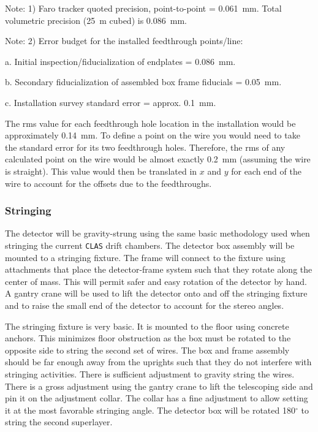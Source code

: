 \noindent
Note: 1) Faro tracker quoted precision, point-to-point = 0.061~mm.  Total 
volumetric precision (25~m cubed) is 0.086~mm.

\vskip 0.1cm

\noindent
Note: 2) Error budget for the installed feedthrough points/line:

\vskip 0.2cm

a. Initial inspection/fiducialization of endplates = 0.086~mm.

b. Secondary fiducialization of assembled box frame fiducials = 0.05~mm.

c. Installation survey standard error = approx. 0.1~mm.

\vskip 0.2cm

The rms value for each feedthrough hole location in the installation would 
be approximately 0.14~mm.  To define a point on the wire you would need to 
take the standard error for its two feedthrough holes.  Therefore, the rms 
of any calculated point on the wire would be almost exactly 0.2~mm (assuming 
the wire is straight).  This value would then be translated in $x$ and $y$ 
for each end of the wire to account for the offsets due to the feedthroughs.

\subsubsection{Stringing}

The detector will be gravity-strung using the same basic methodology 
used when stringing the current {\tt CLAS} drift chambers.  The detector box 
assembly will be mounted to a stringing fixture.  The frame will connect to 
the fixture using attachments that place the detector-frame system such that 
they rotate along the center of mass.  This will permit safer and easy 
rotation of the detector by hand.  A gantry crane will be used to lift the 
detector onto and off the stringing fixture and to raise the small end of 
the detector to account for the stereo angles.

The stringing fixture is very basic.  It is mounted to the floor using 
concrete anchors.  This minimizes floor obstruction as the box must be 
rotated to the opposite side to string the second set of wires.  The box 
and frame assembly should be far enough away from the uprights such that 
they do not interfere with stringing activities.  There is sufficient 
adjustment to gravity string the wires.  There is a gross adjustment using 
the gantry crane to lift the telescoping side and pin it on the adjustment 
collar.  The collar has a fine adjustment to allow setting it at the most 
favorable stringing angle.  The detector box will be rotated 180$^\circ$ to 
string the second superlayer.

